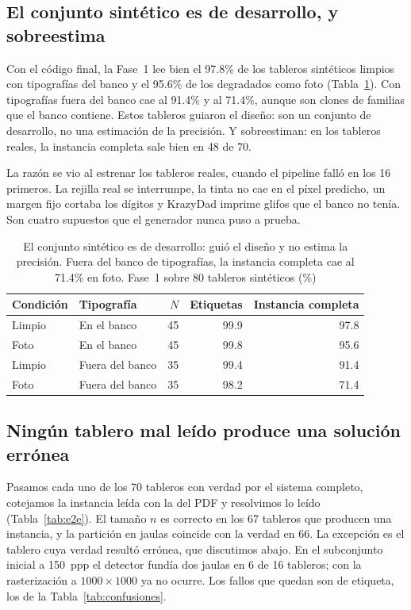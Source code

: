 \documentclass[conference]{IEEEtran}
\begin{document}
\subsection{El conjunto sintético es de desarrollo, y sobreestima}\label{sec:sintetico}
Con el código final, la Fase~1 lee bien el 97.8\% de los tableros sintéticos limpios con tipografías del banco y el 95.6\% de los degradados como foto (Tabla~\ref{tab:sinteticos}). Con tipografías fuera del banco cae al 91.4\% y al 71.4\%, aunque son clones de familias que el banco contiene. Estos tableros guiaron el diseño: son un conjunto de desarrollo, no una estimación de la precisión. Y sobreestiman: en los tableros reales, la instancia completa sale bien en 48 de 70.

La razón se vio al estrenar los tableros reales, cuando el pipeline falló en los 16 primeros. La rejilla real se interrumpe, la tinta no cae en el píxel predicho, un margen fijo cortaba los dígitos y KrazyDad imprime glifos que el banco no tenía. Son cuatro supuestos que el generador nunca puso a prueba.

\begin{table}[t]
\caption{El conjunto sintético es de desarrollo: guió el diseño y no estima la precisión. Fuera del banco de tipografías, la instancia completa cae al 71.4\% en foto. Fase~1 sobre 80 tableros sintéticos (\%)}
\label{tab:sinteticos}
\centering
\setlength{\tabcolsep}{4pt}
\begin{tabular}{llrrr}
\toprule
Condición & Tipografía & $N$ & Etiquetas & Instancia completa \\
\midrule
Limpio & En el banco & 45 & 99.9 & 97.8 \\
Foto & En el banco & 45 & 99.8 & 95.6 \\
Limpio & Fuera del banco & 35 & 99.4 & 91.4 \\
Foto & Fuera del banco & 35 & 98.2 & 71.4 \\
\bottomrule
\end{tabular}
\end{table}

\subsection{Ningún tablero mal leído produce una solución errónea}\label{sec:e2e}
Pasamos cada uno de los 70 tableros con verdad por el sistema completo, cotejamos la instancia leída con la del PDF y resolvimos lo leído (Tabla~\ref{tab:e2e}). El tamaño $n$ es correcto en los 67 tableros que producen una instancia, y la partición en jaulas coincide con la verdad en 66. La excepción es el tablero cuya verdad resultó errónea, que discutimos abajo. En el subconjunto inicial a 150~ppp el detector fundía dos jaulas en 6 de 16 tableros; con la rasterización a $1000 \times 1000$ ya no ocurre. Los fallos que quedan son de etiqueta, los de la Tabla~\ref{tab:confusiones}.
\end{document}
